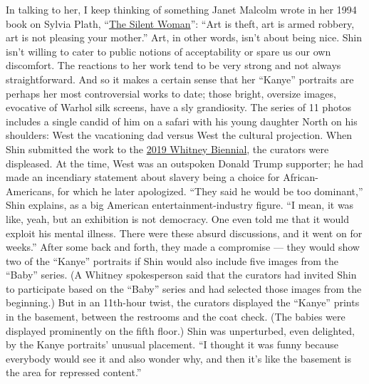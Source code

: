In talking to her, I keep thinking of something Janet Malcolm wrote in
her 1994 book on Sylvia Plath,
``\href{https://www.nytimes3xbfgragh.onion/1994/03/27/books/the-importance-of-being-biased.html}{The
Silent Woman}'': ``Art is theft, art is armed robbery, art is not
pleasing your mother.'' Art, in other words, isn't about being nice.
Shin isn't willing to cater to public notions of acceptability or spare
us our own discomfort. The reactions to her work tend to be very strong
and not always straightforward. And so it makes a certain sense that her
``Kanye'' portraits are perhaps her most controversial works to date;
those bright, oversize images, evocative of Warhol silk screens, have a
sly grandiosity. The series of 11 photos includes a single candid of him
on a safari with his young daughter North on his shoulders: West the
vacationing dad versus West the cultural projection. When Shin submitted
the work to the
\href{https://www.nytimes3xbfgragh.onion/2019/05/16/arts/design/whitney-biennial-review.html}{2019
Whitney Biennial}, the curators were displeased. At the time, West was
an outspoken Donald Trump supporter; he had made an incendiary statement
about slavery being a choice for African-Americans, for which he later
apologized. ``They said he would be too dominant,'' Shin explains, as a
big American entertainment-industry figure. ``I mean, it was like, yeah,
but an exhibition is not democracy. One even told me that it would
exploit his mental illness. There were these absurd discussions, and it
went on for weeks.'' After some back and forth, they made a compromise
--- they would show two of the ``Kanye'' portraits if Shin would also
include five images from the ``Baby'' series. (A Whitney spokesperson
said that the curators had invited Shin to participate based on the
``Baby'' series and had selected those images from the beginning.) But
in an 11th-hour twist, the curators displayed the ``Kanye'' prints in
the basement, between the restrooms and the coat check. (The babies were
displayed prominently on the fifth floor.) Shin was unperturbed, even
delighted, by the Kanye portraits' unusual placement. ``I thought it was
funny because everybody would see it and also wonder why, and then it's
like the basement is the area for repressed content.''

